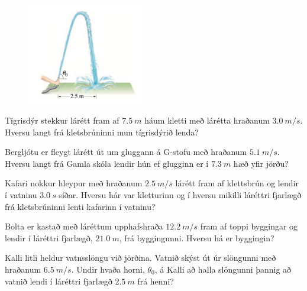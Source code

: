 \begin{enumerate}[label = \textbf{Dæmi \thechapter.\arabic*.}]

\begin{minipage}{\linewidth}

\begin{figure}
\vspace{-1cm}
\includegraphics[width=2in]{images/slanga.png}
\end{figure}

\item Tígrisdýr stekkur lárétt fram af $\SI{7.5}{m}$ háum kletti með lárétta hraðanum $\SI{3.0}{m/s}$. Hversu langt frá kletsbrúninni mun tígrisdýrið lenda?


\item Bergljótu er fleygt lárétt út um gluggann á G-stofu með hraðanum $\SI{5.1}{m/s}$. Hversu langt frá Gamla skóla lendir hún ef glugginn er í $\SI{7.3}{m}$ hæð yfir jörðu?

\item Kafari nokkur hleypur með hraðanum $\SI{2.5}{m/s}$ lárétt fram af klettsbrún og lendir í vatninu $\SI{3.0}{s}$ síðar. Hversu hár var kletturinn og í hversu mikilli láréttri fjarlægð frá kletsbrúninni lenti kafarinn í vatninu?

\item Bolta er kastað með láréttum upphafshraða $\SI{12.2}{m/s}$ fram af toppi byggingar og lendir í láréttri fjarlægð, $\SI{21.0}{m}$, frá byggingunni. Hversu há er byggingin?


\item Kalli litli heldur vatnsslöngu við jörðina. Vatnið skýst út úr slöngunni með hraðanum $\SI{6.5}{m/s}$. Undir hvaða horni, $\theta_0$, á Kalli að halla slöngunni þannig að vatnið lendi í láréttri fjarlægð $\SI{2.5}{m}$ frá henni?

\end{minipage}

\begin{minipage}{\linewidth}

\begin{figure}


\end{figure}
\end{minipage}
\end{enumerate}

